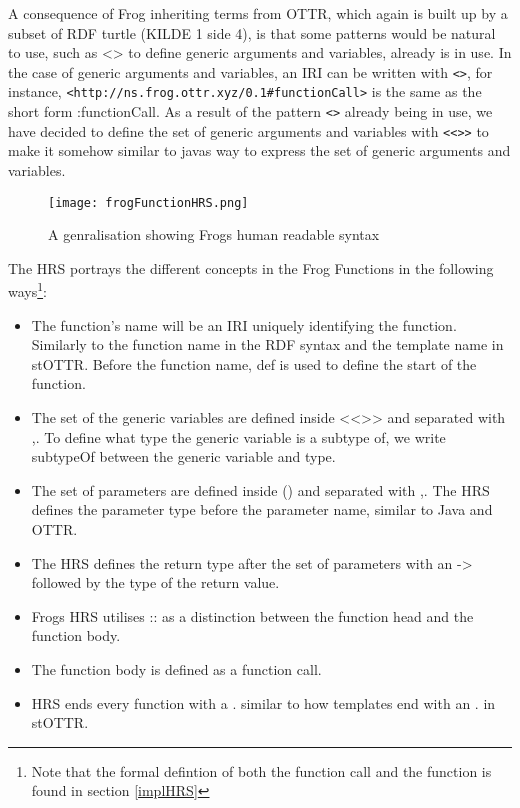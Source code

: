 \para
A consequence of Frog inheriting terms from OTTR, which again is built up by a subset of RDF turtle (KILDE 1 side 4), is that some patterns would be natural to use, such as <> to define generic arguments and variables, already is in use. In the case of generic arguments and variables, an IRI can be written with \lstinline{<>}, for instance, \lstinline{<http://ns.frog.ottr.xyz/0.1#functionCall>} is the same as the short form :functionCall. As a result of the pattern \lstinline{<>} already being in use, we have decided to define the set of generic arguments and variables with \lstinline{<<>>} to make it somehow similar to javas way to express the set of generic arguments and variables.

\begin{figure}
    \centering
    \texttt{[image: frogFunctionHRS.png]}
    \caption{A genralisation showing Frogs human readable syntax }
    \label{fig:frogFunctionHRS}
\end{figure}

\para 
The HRS portrays the different concepts in the Frog Functions in the following ways\footnote{Note that the formal defintion of both the function call and the function is found in section \ref{implHRS}}:
\begin{itemize}
    \item The function's name will be an IRI uniquely identifying the function. Similarly to the function name in the RDF syntax and the template name in stOTTR. Before the function name, def is used to define the start of the function. 
    \item The set of the generic variables are defined inside <<>> and separated with ,. To define what type the generic variable is a subtype of, we write subtypeOf between the generic variable and type.
    \item The set of parameters are defined inside () and separated with ,.  The HRS defines the parameter type before the parameter name, similar to Java and OTTR.
    \item The HRS defines the return type after the set of parameters with an -> followed by the type of the return value.
    \item Frogs HRS utilises :: as a distinction between the function head and the function body.
    \item The function body is defined as a function call.
    \item HRS ends every function with a . similar to how templates end with an . in stOTTR.   
\end{itemize}


